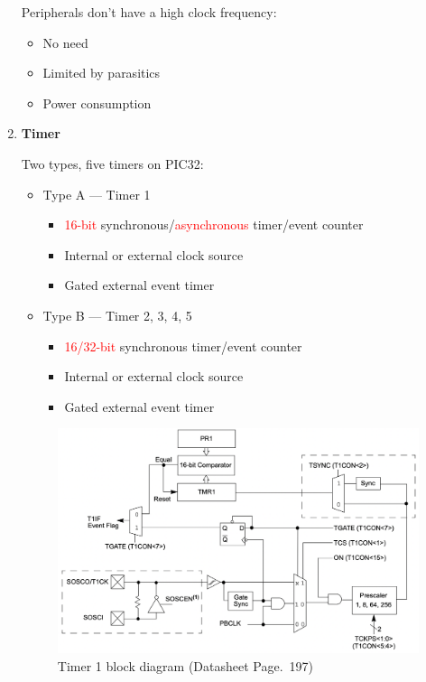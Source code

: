 \documentclass[a4paper]{article}
\begin{document}
\begin{enumerate}[label = \arabic*.]
      \par Peripherals don't have a high clock frequency:
      \begin{itemize}[leftmargin = 1cm]
        \item No need
        \item Limited by parasitics
        \item Power consumption
      \end{itemize}
    \item \textbf{Timer}
      \par Two types, five timers on PIC32:
      \begin{itemize}[leftmargin = 1cm]
        \item Type A --- Timer 1
          \begin{itemize}[leftmargin = 1cm]
            \item \textcolor{red}{16-bit} synchronous/\textcolor{red}{asynchronous} timer/event counter
            \item Internal or external clock source
            \item Gated external event timer
          \end{itemize}
        \item Type B --- Timer 2, 3, 4, 5
          \begin{itemize}[leftmargin = 1cm]
            \item \textcolor{red}{16/32-bit} synchronous timer/event counter
            \item Internal or external clock source
            \item Gated external event timer
          \end{itemize}
      \end{itemize}
      \begin{figure}[H]
        \centering
        \includegraphics[width=0.9\linewidth]{Timer1_block_diagram.png}
        \caption{Timer 1 block diagram (Datasheet Page.~197)}
        \label{fig:Timer1_block_diagram.png}
      \end{figure}


\end{enumerate}
\end{document}
